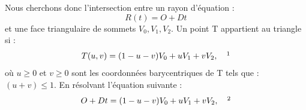 Nous cherchons donc l'intersection entre un rayon d'équation : 
\begin{equation}
R(t) = O + Dt
\end{equation}
%
et une face triangulaire de sommets $ V_0, V_1, V_2$. Un point T appartient au triangle si : 
%
\begin{equation} \label{eq_2moller}
T(u,v) = (1-u-v)V_0 + uV_1 + vV_2, \ \ \ \footnotemark
\end{equation}
%
où  $u\geqslant0$ et $v\geqslant 0$ sont les coordonnées barycentriques de T tels que : $(u+v)\leqslant1$. En résolvant l'équation suivante :
\begin{equation}
O + Dt = (1-u-v)V_0 + uV_1 + vV_2, \ \ \ \footnotemark
\end{equation}
%
%
